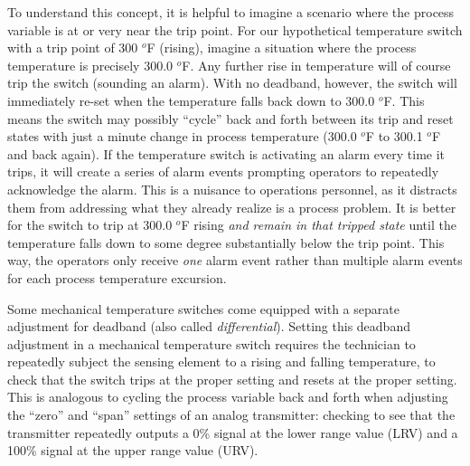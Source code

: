 To understand this concept, it is helpful to imagine a scenario where the process variable is at or very near the trip point.  For our hypothetical temperature switch with a trip point of 300 $^{o}$F (rising), imagine a situation where the process temperature is precisely 300.0 $^{o}$F.  Any further rise in temperature will of course trip the switch (sounding an alarm).  With no deadband, however, the switch will immediately re-set when the temperature falls back down to 300.0 $^{o}$F.  This means the switch may possibly ``cycle'' back and forth between its trip and reset states with just a minute change in process temperature (300.0 $^{o}$F to 300.1 $^{o}$F and back again).  If the temperature switch is activating an alarm every time it trips, it will create a series of alarm events prompting operators to repeatedly acknowledge the alarm.  This is a nuisance to operations personnel, as it distracts them from addressing what they already realize is a process problem.  It is better for the switch to trip at 300.0 $^{o}$F rising \textit{and remain in that tripped state} until the temperature falls down to some degree substantially below the trip point.  This way, the operators only receive \textit{one} alarm event rather than multiple alarm events for each process temperature excursion.

Some mechanical temperature switches come equipped with a separate adjustment for deadband (also called \textit{differential}).  Setting this deadband adjustment in a mechanical temperature switch requires the technician to repeatedly subject the sensing element to a rising and falling temperature, to check that the switch trips at the proper setting and resets at the proper setting.  This is analogous to cycling the process variable back and forth when adjusting the ``zero'' and ``span'' settings of an analog transmitter: checking to see that the transmitter repeatedly outputs a 0\% signal at the lower range value (LRV) and a 100\% signal at the upper range value (URV).  


\vskip 10pt

\filbreak

